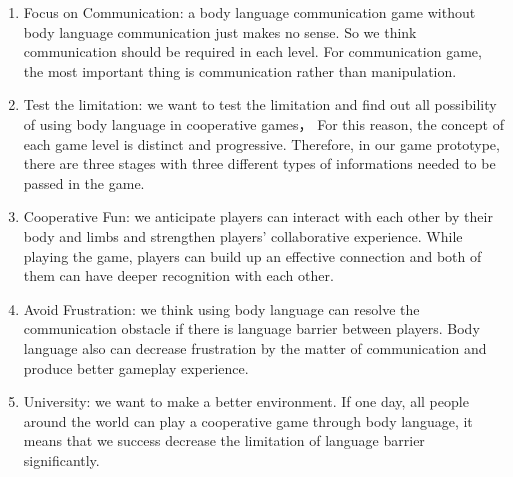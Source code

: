 \documentclass{sigchi}
\begin{document}
\begin{enumerate}
\item Focus on Communication: a body language communication game without body language communication just makes no sense. So we think communication should be required in each level. For communication game, the most important thing is communication rather than manipulation.

\item Test the limitation: we want to test the limitation and find out all possibility of using body language in cooperative games，
For this reason, the concept of each game level is distinct and progressive.
Therefore, in our game prototype, there are three stages with three different types of informations needed to be passed in the game. 

\item Cooperative Fun: 
we anticipate players can interact with each other by their body and limbs and strengthen players' collaborative experience. While playing the game, players can build up an effective connection and both of them can have deeper recognition with each other.

\item Avoid Frustration: 
we think using body language can resolve the communication obstacle if there is language barrier between players. Body language also can decrease frustration by the matter of communication and produce better gameplay experience.

\item University: we want to make a better environment. If one day, all people around the world can play a cooperative game through body language, it means that we success decrease the limitation of language barrier significantly.
\end{enumerate}
\end{document}
